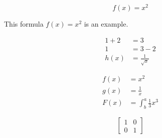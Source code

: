 \documentclass{article}
\begin{document}
\begin{equation*}
	f(x)=x^2
\end{equation*}

This formula $f(x) = x^2$ is an example.

\begin{align*}
	1+2&=3\\
	1&=3-2\\
	h(x) &= \frac{1}{\sqrt{x}}
\end{align*}

\begin{align*}
	f(x) &= x^2\\
	g(x) &= \frac{1}{x}\\
	F(x) &= \int^a_b \frac{1}{3}x^3
\end{align*}

\begin{equation*}
\left[
\begin{matrix}
	1 & 0\\
	0 & 1
\end{matrix}
\right]
\end{equation*}
\end{document}
